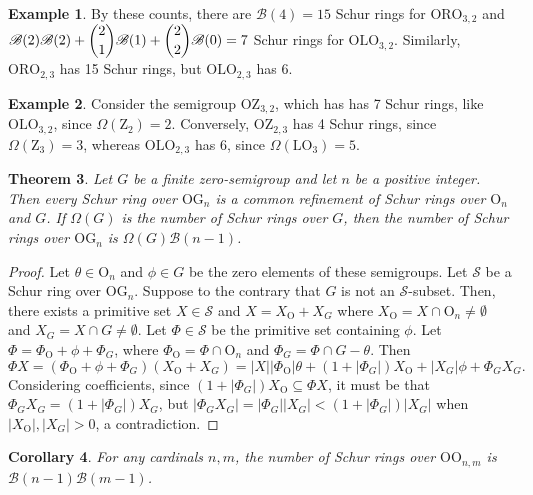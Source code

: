 \documentclass{article}
\theoremstyle{plain}
\newtheorem{Thm}{Theorem}[section]
\newtheorem{Cor}[Thm]{Corollary}
\theoremstyle{definition}
\newtheorem{Exam}[Thm]{Example}
\renewcommand{\S}{\mathcal{S}}
\newcommand{\B}{\mathscr{B}}
\renewcommand{\O}{\mathrm{O}}
\newcommand{\LO}{\mathrm{LO}}
\newcommand{\ORO}{\mathrm{ORO}}
\newcommand{\OLO}{\mathrm{OLO}}
\newcommand{\z}{\mathrm{Z}}
\newcommand{\OO}{\mathrm{OO}}
\newcommand{\OZ}{\mathrm{OZ}}
\newcommand{\OG}{\mathrm{OG}}
\begin{document}
\begin{Exam} By these counts, there are $\B(4) = 15$ Schur rings for $\ORO_{3,2}$ and $\B(2)\B(2) + \dbinom{2}{1}\B(1) + \dbinom{2}{2}\B(0) = 7$ Schur rings for $\OLO_{3,2}$. Similarly, $\ORO_{2,3}$ has 15 Schur rings, but $\OLO_{2,3}$ has 6. \end{Exam}

\begin{Exam}
    Consider the semigroup $\OZ_{3,2}$, which has %
has 7 Schur rings, like $\OLO_{3,2}$, since $\Omega(\z_2)=2$. Conversely, $\OZ_{2,3}$ has 4 Schur rings, since $\Omega(\z_3)=3$, whereas $\OLO_{2,3}$ has 6, since $\Omega(\LO_3)=5$. 
\end{Exam}

\begin{Thm}\label{thm:och} Let $G$ be a finite zero-semigroup and let $n$ be a positive integer. Then every Schur ring over $\OG_n$ is a common refinement of Schur rings over $\O_n$ and $G$. If $\Omega(G)$ is the number of Schur rings over $G$, then the number of Schur rings over $\OG_n$ is $\Omega(G)\B(n-1)$.
\end{Thm}
\begin{proof}
    Let $\theta\in \O_n$ and $\phi\in G$ be the zero elements of these semigroups. Let $\S$ be a Schur ring over $\OG_n$. Suppose to the contrary that $G$ is not an $\S$-subset. Then, there exists a primitive set $X\in \S$ and $X=X_\O+X_G$ where $X_\O=X\cap \O_n\neq \emptyset$ and $X_G=X\cap G\neq \emptyset$. Let $\Phi\in \S$ be the primitive set containing $\phi$. Let $\Phi = \Phi_\O + \phi + \Phi_G$, where $\Phi_\O=\Phi\cap \O_n$ and $\Phi_G = \Phi\cap G-\theta$. Then \[\Phi X = (\Phi_\O + \phi + \Phi_G)(X_\O+X_G) = |X||\Phi_\O|\theta + (1+|\Phi_G|)X_\O + |X_G|\phi + \Phi_GX_G.\] Considering coefficients, since $(1+|\Phi_G|)X_\O\subseteq \Phi X$, it must be that $\Phi_GX_G = (1+|\Phi_G|)X_G$, but $|\Phi_GX_G| = |\Phi_G||X_G| < (1+|\Phi_G|)|X_G|$ when $|X_\O|,|X_G|>0$, a contradiction.
\end{proof}

\begin{Cor}\label{oo} For any cardinals $n,m$, the number of Schur rings over $\OO_{n,m}$ is $\B(n-1)\B(m-1)$.
\end{Cor}
\end{document}
